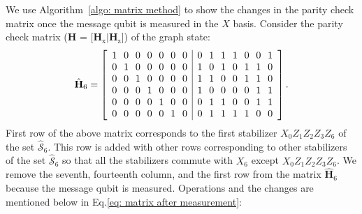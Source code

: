 \documentclass[reprint, amsmath,amssymb, aps,pra,
 floatfix,
]{revtex4-2}
\begin{document}
\noindent We use Algorithm~\ref{algo: matrix method} to show the changes in the parity check matrix once the message qubit is measured in the $X$ basis. 
Consider the parity check matrix ($\mathbf{H}$ = [$\mathbf{H}_\mathrm{x}|\mathbf{H}_\mathrm{z}$]) of the graph state:
\begin{equation}
 \hat{\mathbf{H}}_6=\begin{bmatrix}
\scriptsize\begin{array}{c@{\hskip 7pt}c@{\hskip 7pt}c@{\hskip 7pt}c@{\hskip 7pt}c@{\hskip 7pt}c@{\hskip 7pt}c|c@{\hskip 7pt}c@{\hskip 7pt}c@{\hskip 7pt}c@{\hskip 7pt}c@{\hskip 7pt}c@{\hskip 7pt}c}
     1&0&0&0&0&0&0 &0&1&1&1&0&0&1  \\
     0&1&0&0&0&0&0 &1&0&1&0&1&1&0 \\
     0&0&1&0&0&0&0 &1&1&0&0&1&1&0 \\
     0&0&0&1&0&0&0 &1&0&0&0&0&1&1 \\
     0&0&0&0&1&0&0 &0&1&1&0&0&1&1 \\
     0&0&0&0&0&1&0 &0&1&1&1&1&0&0 
\end{array}\end{bmatrix}.
\label{matrix:before meas}
\end{equation}
First row of the above matrix corresponds to the first stabilizer $ X_0Z_1Z_2Z_3Z_6$ of the set $\mathcal{\hat{S}}_6$. 
This row is added with other rows corresponding to other stabilizers of the set $\mathcal{\hat{S}}_6$ so that all the stabilizers commute with $X_6$ except $ X_0Z_1Z_2Z_3Z_6$.
We remove the seventh, fourteenth column, and the first row from the matrix $ \hat{\mathbf{H}}_6$ because the message qubit is measured.
Operations and the changes are mentioned below in Eq.\eqref{eq: matrix after measurement}:
\end{document}
